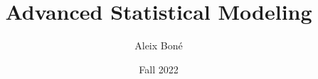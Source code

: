 




\usetikzlibrary{pgfplots.dateplot}

\usetikzlibrary{arrows.meta}


\newcommand*\GnuplotDefs{
    set samples 101;
    Binv(p,q)=exp(lgamma(p+q)-lgamma(p)-lgamma(q));
    beta(x,p,q)=p<=0||q<=0?1/0:x<0||x>1?0.0:Binv(p,q)*x**(p-1.0)*(1.0-x)**(q-1.0);
    gammaPdf(x,a,b)=b**a*x**(a-1)*exp(-b*x)/gamma(a);
}

\newenvironment{nscenter}
 {\parskip=0pt\par\nopagebreak\centering}
 {\par\noindent\ignorespacesafterend}


\renewcommand\and{\\[\baselineskip]}

\title{Advanced Statistical Modeling}
\author{Aleix Boné}
\date{Fall 2022}

\makeindex


\newcommand{\iemph}[1]{\index{#1}\emph{#1}}

